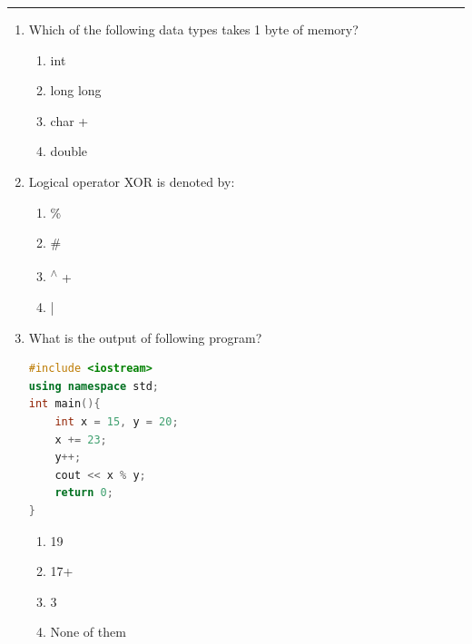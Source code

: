 \documentclass[11pt]{article}
\begin{document}
\medskip\hrule
\begin{enumerate}

\item Which of the following data types takes 1 byte of memory?
\begin{enumerate}
    \item int
    \item long long
    \item char +
    \item double
\end{enumerate}

\item Logical operator XOR is denoted by:
\begin{enumerate}
    \item \%
    \item \#
    \item \textsuperscript{$\wedge$} +
    \item |
\end{enumerate}


\item What is the output of following program?
\begin{lstlisting}[language=C++]
#include <iostream>
using namespace std;
int main(){
    int x = 15, y = 20;
    x += 23;
    y++;
    cout << x % y;
    return 0;
}

\end{lstlisting}
\begin{enumerate}
    \item 19
    \item 17+
    \item 3
    \item None of them
\end{enumerate}



\end{enumerate}
\end{document}
